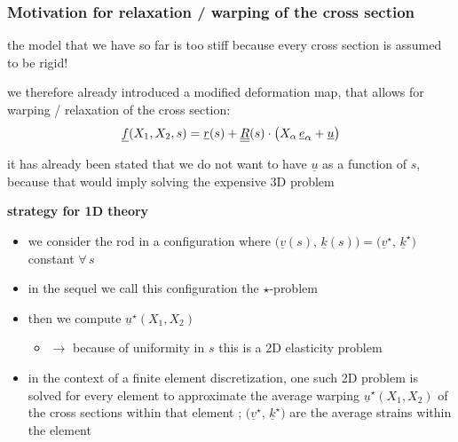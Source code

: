 \begin{frame}
  \frametitle{Motivation for relaxation / warping of the cross section}
  
  the model that we have so far is too stiff because every cross section is assumed to be rigid!

  \vspace{0.5em}
  we therefore already introduced a modified deformation map,
  that allows for warping / relaxation of the cross section:
  \begin{displaymath}
    \underline{f}(X_1,X_2,s) = 
    \underline{r}(s) + \underline{\underline{R}}(s) \cdot \bigl( X_{\alpha} \, \underline{e}_{\alpha} + \underline{u} \bigr)
  \end{displaymath}
  
  
  it has already been stated that we do not want to have $\underline{u}$ as a function of $s$, \newline
  because that would imply solving the expensive 3D problem
  
  \vspace{0.8em}
  \textbf{strategy for 1D theory}
  \begin{itemize}
    \item we consider the rod in a configuration where $\bigl( \underline{v}(s), \, \underline{k}(s) \bigr) = \bigl( \underline{v}^{\star}, \, \underline{k}^{\star} \bigr)$ constant $\forall \, s$
    \item in the sequel we call this configuration the $\star$-problem
    \item then we compute $\underline{u}^{\star}(X_1,X_2)$
      \begin{itemize}
        \item $\rightarrow$ because of uniformity in $s$ this is a 2D elasticity problem
      \end{itemize}
    \item in the context of a finite element discretization, one such 2D problem is solved for every element to approximate the average warping $\underline{u}^{\star}(X_1,X_2)$ of the cross sections within that element ; $\bigl( \underline{v}^{\star}, \, \underline{k}^{\star} \bigr)$ are the average strains within the element
  \end{itemize}
\end{frame}


